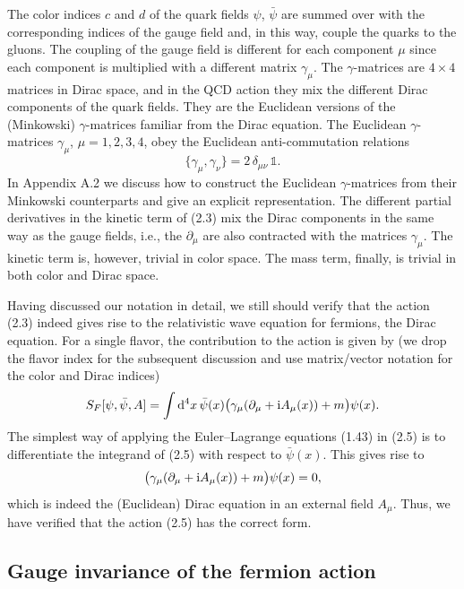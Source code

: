 The color indices $c$ and $d$ of the quark fields $\psi$, $\bar\psi$ are
summed over with the corresponding indices of the gauge field and, in this
way, couple the quarks to the gluons. The coupling of the gauge field is
different for each component $\mu$ since each component is multiplied with
a different matrix $\gamma_\mu$. The $\gamma$-matrices are $4\times 4$
matrices in Dirac space, and in the QCD action they mix the different Dirac
components of the quark fields. They are the Euclidean versions of the
(Minkowski) $\gamma$-matrices familiar from the Dirac equation. The
Euclidean $\gamma$-matrices $\gamma_\mu$, $\mu = 1, 2, 3, 4$, obey the
Euclidean anti-commutation relations
\begin{equation}
  \{\gamma_\mu, \gamma_\nu\} = 2\,\delta_{\mu\nu}\,\mathbb{1} .
\end{equation}
In Appendix A.2 we discuss how to construct the Euclidean $\gamma$-matrices
from their Minkowski counterparts and give an explicit representation. The
different partial derivatives in the kinetic term of (2.3) mix the Dirac
components in the same way as the gauge fields, i.e., the $\partial_\mu$ are
also contracted with the matrices $\gamma_\mu$. The kinetic term is,
however, trivial in color space. The mass term, finally, is trivial in both
color and Dirac space.

Having discussed our notation in detail, we still should verify that the
action (2.3) indeed gives rise to the relativistic wave equation for
fermions, the Dirac equation. For a single flavor, the contribution to the
action is given by (we drop the flavor index for the subsequent discussion
and use matrix/vector notation for the color and Dirac indices)
\begin{equation}
  S_F[\psi, \bar\psi, A] = \int \mathrm{d}^4 x\,
    \bar\psi(x) \big(\gamma_\mu (\partial_\mu + \mathrm{i} A_\mu(x)) + m\big)
    \psi(x) .
\end{equation}
The simplest way of applying the Euler--Lagrange equations (1.43) in (2.5)
is to differentiate the integrand of (2.5) with respect to $\bar\psi(x)$.
This gives rise to
\begin{equation}
  \big(\gamma_\mu (\partial_\mu + \mathrm{i} A_\mu(x)) + m\big) \psi(x) = 0 ,
\end{equation}
which is indeed the (Euclidean) Dirac equation in an external field
$A_\mu$. Thus, we have verified that the action (2.5) has the correct form.

\subsection{Gauge invariance of the fermion action}

